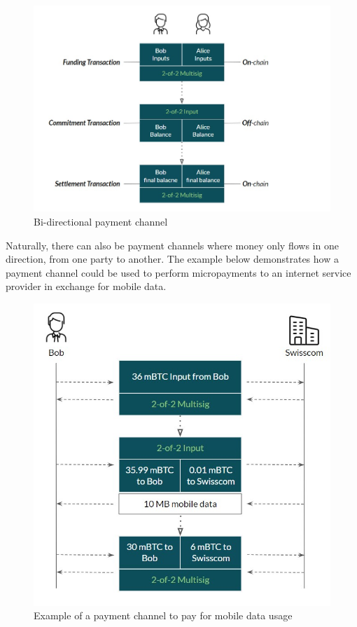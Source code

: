 \documentclass[a4paper, 12pt]{report}
\begin{document}
\begin{figure}[h]
	\includegraphics[width=\textwidth]{04_Bidirectional_Channel}
	\caption{Bi-directional payment channel}
	\label{fig:04_Bidirectional_Channel}
\end{figure}

\par Naturally, there can also be payment channels where money only flows in one direction, from one party to another. The example below demonstrates how a payment channel could be used to perform micropayments to an internet service provider in exchange for mobile data.

\begin{figure}[h]
	\includegraphics[width=\textwidth]{05_Onedirectional_Channel}
	\caption{Example of a payment channel to pay for mobile data usage}
	\label{fig:05_Onedirectional_Channel}
\end{figure}
\end{document}
